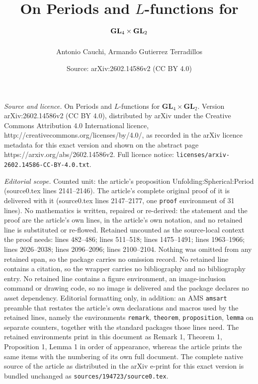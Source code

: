 \documentclass[10pt,a4paper]{amsart}
\title{On Periods and $L$-functions for $\GL_4 \times \GL_2$}
\author{Antonio Cauchi, Armando Gutierrez Terradillos}
\date{Source: arXiv:2602.14586v2 (CC BY 4.0)}
\def\GL{\mathbf{GL}}
\begin{document}
\maketitle

\noindent\emph{Source and licence.} On Periods and $L$-functions for $\GL_4 \times \GL_2$. Version arXiv:2602.14586v2 (CC BY 4.0), distributed by arXiv under the Creative Commons Attribution 4.0 International licence, http://creativecommons.org/licenses/by/4.0/, as recorded in the arXiv licence metadata for this exact version and shown on the abstract page https://arxiv.org/abs/2602.14586v2. Full licence notice: \texttt{licenses/arxiv-2602.14586-CC-BY-4.0.txt}.\par\smallskip

\noindent\textit{Editorial scope.} Counted unit: the article's proposition Unfolding:Spherical:Period (source0.tex lines 2141--2146). The article's complete original proof of it is delivered with it (source0.tex lines 2147--2177, one \texttt{proof} environment of 31 lines). No mathematics is written, repaired or re-derived: the statement and the proof are the article's own lines, in the article's own notation, and no retained line is substituted or re-flowed.  Retained uncounted as the source-local context the proof needs: lines 482--486; lines 511--518; lines 1475--1491; lines 1963--1966; lines 2026--2038; lines 2096--2096; lines 2100--2104.  Nothing was omitted from any retained span, so the package carries no omission record.  No retained line contains a citation, so the wrapper carries no bibliography and no bibliography entry.  No retained line contains a figure environment, an image-inclusion command or drawing code, so no image is delivered and the package declares no asset dependency.  Editorial formatting only, in addition: an AMS \texttt{amsart} preamble that restates the article's own declarations and macros used by the retained lines, namely the environments \texttt{remark}, \texttt{theorem}, \texttt{proposition}, \texttt{lemma} on separate counters, together with the standard packages those lines need.  The retained environments print in this document as Remark 1, Theorem 1, Proposition 1, Lemma 1 in order of appearance, whereas the article prints the same items with the numbering of its own full document.  The complete native source of the article as distributed in the arXiv e-print for this exact version is bundled unchanged as \texttt{sources/194723/source0.tex}.
\end{document}
